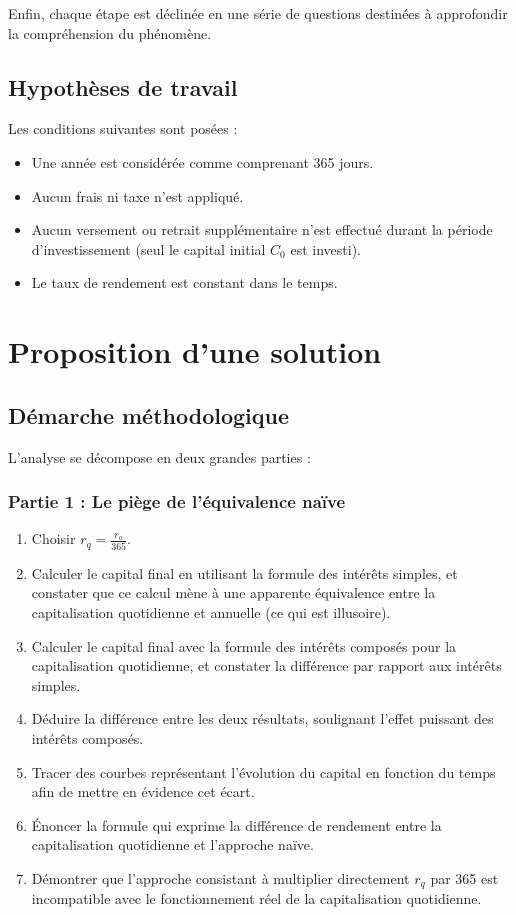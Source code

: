 \documentclass{article}
\begin{document}
Enfin, chaque étape est déclinée en une série de questions destinées à approfondir la compréhension du phénomène.

\subsection{Hypothèses de travail}
Les conditions suivantes sont posées :
\begin{itemize}
    \item Une année est considérée comme comprenant 365 jours.
    \item Aucun frais ni taxe n'est appliqué.
    \item Aucun versement ou retrait supplémentaire n’est effectué durant la période d'investissement (seul le capital initial \( C_0 \) est investi).
    \item Le taux de rendement est constant dans le temps.
\end{itemize}

\section{Proposition d'une solution}
\subsection{Démarche méthodologique}
L'analyse se décompose en deux grandes parties :

\subsubsection*{Partie 1 : Le piège de l'équivalence naïve}
\begin{enumerate}
    \item Choisir \( r_q = \frac{r_a}{365} \).
    \item Calculer le capital final en utilisant la formule des intérêts simples, et constater que ce calcul mène à une apparente équivalence entre la capitalisation quotidienne et annuelle (ce qui est illusoire).
    \item Calculer le capital final avec la formule des intérêts composés pour la capitalisation quotidienne, et constater la différence par rapport aux intérêts simples.
    \item Déduire la différence entre les deux résultats, soulignant l'effet puissant des intérêts composés.
    \item Tracer des courbes représentant l'évolution du capital en fonction du temps afin de mettre en évidence cet écart.
    \item Énoncer la formule qui exprime la différence de rendement entre la capitalisation quotidienne et l'approche naïve.
    \item Démontrer que l'approche consistant à multiplier directement \( r_q \) par 365 est incompatible avec le fonctionnement réel de la capitalisation quotidienne. %
\end{enumerate}
\end{document}
